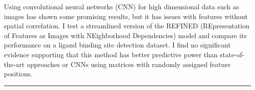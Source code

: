 \documentclass[12pt]{report}
\begin{document}
Using convolutional neural networks (CNN) for high dimensional data such as images has shown some promising results, but it has issues with features without spatial correlation. I test a streamlined version of the REFINED (REpresentation of Features as Images with NEighborhood Dependencies) model and compare its performance on a ligand binding site detection dataset. I find no significant evidence supporting that this method has better predictive power than state-of-the-art approaches or CNNs using matrices with randomly assigned feature positions.

\noindent\rule{2cm}{0.4pt}
\end{document}
